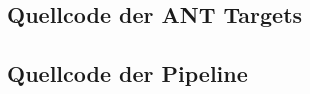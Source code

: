 % 
% 
% 
% 

% 


\subsection{Quellcode der ANT Targets}
\label{app:anttargets}


\subsection{Quellcode der Pipeline}
\label{app:casperpipeline}



% 
